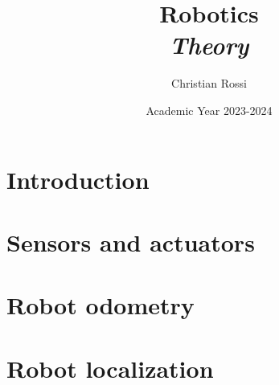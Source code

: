 \documentclass[12pt, a4paper]{report}
\title{Robotics \\ \textit{Theory}}
\author{Christian Rossi}
\date{Academic Year 2023-2024}
\begin{document}
    \maketitle

    

    \cleardoublepage{}

    \tableofcontents

    \cleardoublepage{}

    \chapter{Introduction}
    
    
    

    \chapter{Sensors and actuators}
    
    

    \chapter{Robot odometry}
    
        
        
        
      
      
      
      
      

    \chapter{Robot localization}
    
    
    
    

    
\end{document}
